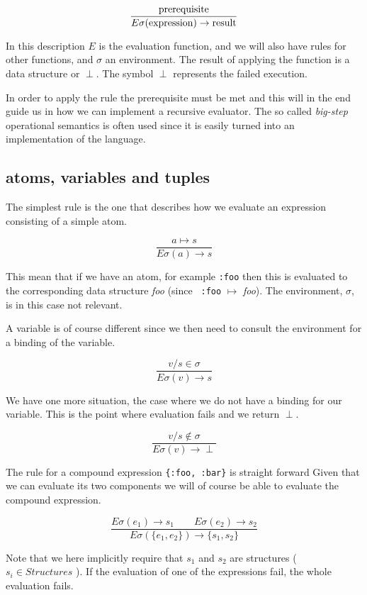 \documentclass[a4paper,11pt]{article}
\begin{document}
$$\frac{{\rm prerequisite}}{E\sigma({\rm expression}) \rightarrow {\rm result}}$$

In this description $E$ is the evaluation function, and we will also
have rules for other functions, and $\sigma$ an environment. The result
of applying the function is a data structure or $\perp$. The symbol
$\perp$ represents the failed execution.

In order to apply the rule the prerequisite must be met and this will
in the end guide us in how we can implement a recursive evaluator. The
so called {\em big-step} operational semantics is often used since it
is easily turned into an implementation of the language.

\subsection{atoms, variables and tuples}

The simplest rule is the one that describes how we evaluate an
expression consisting of a simple atom.

$$\frac{a \mapsto s}{E\sigma(a) \rightarrow s}$$  

This mean that if we have an atom, for example {\tt :foo} then this is
evaluated to the corresponding data structure {\em foo} (since {\tt
  :foo} $\mapsto$ {\em foo}). The environment, $\sigma$, is in this case
not relevant.

A variable is of course different since we then need to consult the
environment for a binding of the variable.

   $$\frac{v/s \in \sigma}{E\sigma(v) \rightarrow s}$$

We have one more situation, the case where we do not have a binding
for our variable. This is the point where evaluation fails and we return $\perp$.

   $$\frac{v/s \not\in \sigma}{E\sigma(v) \rightarrow \perp}$$
   
   
The rule for a compound expression {\tt \{:foo, :bar\}} is straight
forward Given that we can evaluate its two components we will of
course be able to evaluate the compound expression.

$$\frac{ E\sigma(e_1) \rightarrow s_1 \qquad   E\sigma(e_2) \rightarrow s_2}{E\sigma(\lbrace e_1 , e_2\rbrace) \rightarrow \lbrace s_1, s_2\rbrace}$$

Note that we here implicitly require that $s_1$ and $s_2$ are
structures ( $ s_i \in Structures$ ). If the evaluation of one of the expressions fail, the whole evaluation fails. 
\end{document}
